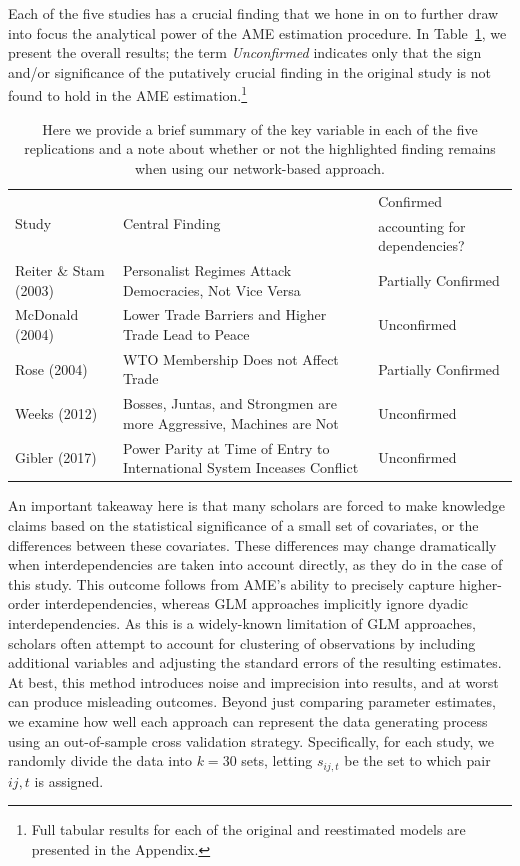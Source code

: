 Each of the five studies has a crucial finding that we hone in on to further draw into focus the analytical power of the AME estimation procedure.  In Table~\ref{tab:modelFindingSumm}, we present the overall results; the term \textit{Unconfirmed} indicates only that the sign and/or significance of the putatively crucial finding in the original study is not found to hold in the AME estimation.\footnote{Full tabular results for each of the original and reestimated models are presented in the Appendix.}

\begin{table}[ht]
\centering
\caption{Here we provide a brief summary of the key variable in each of the five replications and a note about whether or not the highlighted finding remains when using our network-based approach.}
	\begin{tabular}{l p{7cm} l} \toprule
		\multirow{2}{*}{Study} & \multirow{2}{*}{Central Finding} &  Confirmed \\
		& &  accounting for dependencies? \\ \toprule
		Reiter \& Stam (2003) & Personalist Regimes Attack Democracies, Not Vice Versa & {Partially Confirmed} \\ \midrule
		McDonald (2004) & Lower Trade Barriers and Higher Trade Lead to Peace & {Unconfirmed}\\ \midrule
		Rose (2004) & WTO Membership Does not Affect Trade & {Partially Confirmed}\\ \midrule
		Weeks (2012) & Bosses, Juntas, and Strongmen are more Aggressive, Machines are Not & {Unconfirmed} \\\midrule
		Gibler (2017) & Power Parity at Time of Entry to International System Inceases Conflict & {Unconfirmed}\\ \bottomrule
	\end{tabular}
	\label{tab:modelFindingSumm}
\end{table}

An important takeaway here is that many scholars are forced to make knowledge claims based on the statistical significance of a small set of covariates, or the differences between these covariates.  These differences may change dramatically when interdependencies are taken into account directly, as they do in the case of this study. This outcome follows from AME's ability to precisely capture higher-order interdependencies, whereas GLM approaches implicitly ignore dyadic interdependencies. As this is a widely-known limitation of GLM approaches, scholars often attempt to account for clustering of observations by including additional variables and adjusting the standard errors of the resulting estimates. At best, this method introduces noise and imprecision into results, and at worst can produce misleading outcomes.   Beyond just comparing parameter estimates, we examine how well each approach can represent the data generating process using an out-of-sample cross validation strategy. Specifically, for each study, we randomly divide the data into $k=30$ sets, letting $s_{ij,t}$ be the set to which pair $ij,t$ is assigned.

